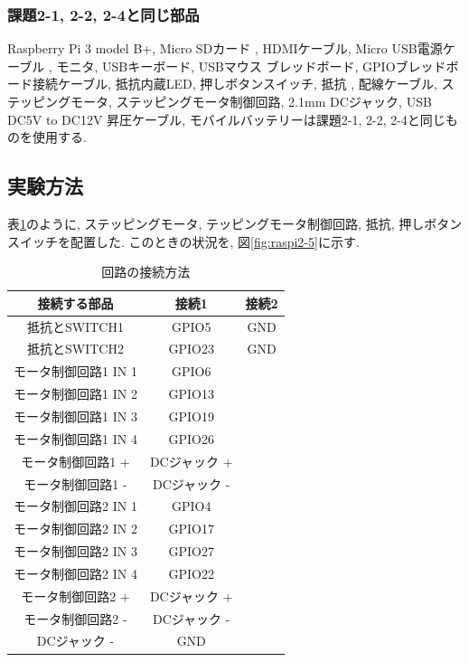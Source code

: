 \documentclass{ltjsarticle} %
\begin{document}
\subsubsection{課題2-1, 2-2, 2-4と同じ部品}
Raspberry Pi 3 model B+, Micro SDカード
, HDMIケーブル, Micro USB電源ケーブル
, モニタ, USBキーボード, USBマウス
ブレッドボード, GPIOブレッドボード接続ケーブル, 抵抗内蔵LED, 押しボタンスイッチ, 抵抗
, 配線ケーブル, ステッピングモータ, ステッピングモータ制御回路, 
2.1mm DCジャック,  USB DC5V to DC12V 昇圧ケーブル, 
モバイルバッテリーは課題2-1, 2-2, 2-4と同じものを使用する. 


\subsection{実験方法}

表\ref{tab:tab2-5}のように, ステッピングモータ, テッピングモータ制御回路, 抵抗, 押しボタンスイッチを配置した.
このときの状況を, 図\ref{fig:raspi2-5}に示す. 

\begin{table}[H] %
  \centering %
  \caption{回路の接続方法}
  \begin{tabular}{|c|c|c|} 
  \hline %
  接続する部品 & 接続1 & 接続2 \\ \hline %
  抵抗とSWITCH1 & GPIO5 & GND \\ \hline
  抵抗とSWITCH2 & GPIO23 & GND \\ \hline
  モータ制御回路1 IN 1 & GPIO6 &   \\ \hline
  モータ制御回路1 IN 2 & GPIO13 &  \\ \hline
  モータ制御回路1 IN 3 & GPIO19 &  \\ \hline
  モータ制御回路1 IN 4 & GPIO26 &  \\ \hline
  モータ制御回路1 + & DCジャック + & \\ \hline
  モータ制御回路1 - & DCジャック - & \\ \hline
  モータ制御回路2 IN 1 & GPIO4 &   \\ \hline
  モータ制御回路2 IN 2 & GPIO17 &  \\ \hline
  モータ制御回路2 IN 3 & GPIO27 &  \\ \hline
  モータ制御回路2 IN 4 & GPIO22 &  \\ \hline
  モータ制御回路2 + & DCジャック + & \\ \hline
  モータ制御回路2 - & DCジャック - & \\ \hline
  DCジャック -  & GND & \\ \hline

  \end{tabular}
  \label{tab:tab2-5} %
\end{table}
\end{document}
